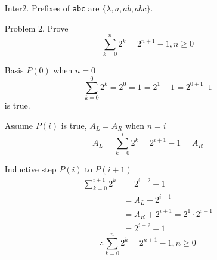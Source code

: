 \documentclass{article}
\begin{document}
\begin{enumerate}
	\item[Inter2.]
		Prefixes of \texttt{abc} are $\{\lambda, a, ab, abc\}$.

	\item[Problem 2.]
		Prove $$\sum_{k=0}^n 2^k = 2^{n+1} - 1, n \geq 0$$

		Basis $P(0)$ when $n = 0$
		$$\sum_{k=0}^0 2^k = 2^0 = 1 = 2^1 - 1 = 2^{0+1} – 1$$
		is true.

		Assume $P(i)$ is true, $A_L = A_R$ when $n = i$
		$$A_L = \sum_{k=0}^i 2^k = 2^{i+1} - 1 = A_R$$

		Inductive step $P(i)$ to $P(i + 1)$
		\begin{align*}
			\sum_{k=0}^{i+1} 2^k &= 2^{i+2} - 1 \\
				&= A_L + 2^{i+1} \\
				&= A_R + 2^{i+1} = 2^1 \cdot 2^{i+1} \\
				&= 2^{i+2} - 1
		\end{align*}
		$$\therefore \sum_{k=0}^n 2^k = 2^{n+1} - 1, n \geq 0$$
\end{enumerate}
\end{document}
